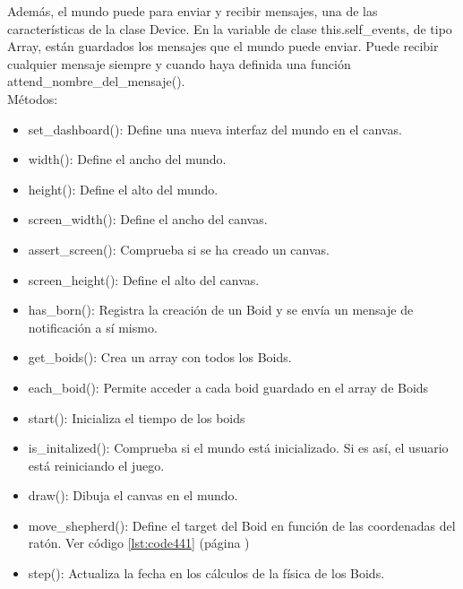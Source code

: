 Además, el mundo puede para enviar y recibir mensajes, una de las características de la clase Device. En la variable de clase 
this.self\_events, de tipo Array, están guardados los mensajes que el mundo puede enviar. Puede recibir cualquier mensaje siempre y cuando
haya definida una función attend\_nombre\_del\_mensaje().\\

Métodos:
\begin{itemize}
 \item set\_dashboard():
Define una nueva interfaz del mundo en el canvas.

 \item width():
Define el ancho del mundo.

 \item height():
Define el alto del mundo.

 \item screen\_width():
Define el ancho del canvas.

 \item assert\_screen():
Comprueba si se ha creado un canvas.

 \item screen\_height():
Define el alto del canvas.

 \item has\_born():
Registra la creación de un Boid y se envía un mensaje de notificación a sí mismo.

 \item get\_boids():
Crea un array con todos los Boids.

 \item each\_boid():
Permite acceder a cada boid guardado en el array de Boids

 \item start():
Inicializa el tiempo de los boids

 \item is\_initalized():
Comprueba si el mundo está inicializado. Si es así, el usuario está reiniciando el juego.

 \item draw():
Dibuja el canvas en el mundo.

 \item move\_shepherd():
Define el target del Boid en función de las coordenadas del ratón. Ver código \ref{lst:code441} (página \pageref{lst:code441})

 \item step():
Actualiza la fecha en los cálculos de la física de los Boids.


\end{itemize}
